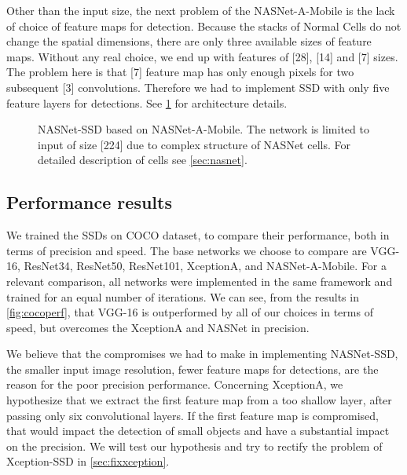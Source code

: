 Other than the input size, the next problem of the NASNet-A-Mobile is the lack of choice of feature maps for detection. Because the stacks of Normal Cells do not change the spatial dimensions, there are only three available sizes of feature maps. Without any real choice, we end up with features of [28], [14] and [7] sizes. The problem here is that [7] feature map has only enough pixels for two subsequent [3] convolutions. Therefore we had to implement SSD with only five feature layers for detections. See \cref{fig:nasnetSSD} for architecture details.


\begin{figure}
    \centering
    \nasnetSSD
    \caption[NASNet-SSD]%
    {NASNet-SSD based on NASNet-A-Mobile. The network is limited to input of size [224] due to complex structure of NASNet cells. For detailed description of cells see \cref{sec:nasnet}.}
    \label{fig:nasnetSSD}
\end{figure}

\subsection{Performance results}
We trained the SSDs on COCO dataset, to compare their performance, both in terms of precision and speed. The base networks we choose to compare are VGG-16, ResNet34, ResNet50, ResNet101, XceptionA, and NASNet-A-Mobile. For a relevant comparison, all networks were implemented in the same framework and trained for an equal number of iterations. We can see, from the results in \cref{fig:cocoperf}, that VGG-16 is outperformed by all of our choices in terms of speed, but overcomes the XceptionA and NASNet in precision. 

We believe that the compromises we had to make in implementing NASNet-SSD, the smaller input image resolution, fewer feature maps for detections, are the reason for the poor precision performance. Concerning XceptionA, we hypothesize that we extract the first feature map from a too shallow layer, after passing only six convolutional layers. If the first feature map is compromised, that would impact the detection of small objects and have a substantial impact on the precision. We will test our hypothesis and try to rectify the problem of Xception-SSD in \cref{sec:fixxception}.

